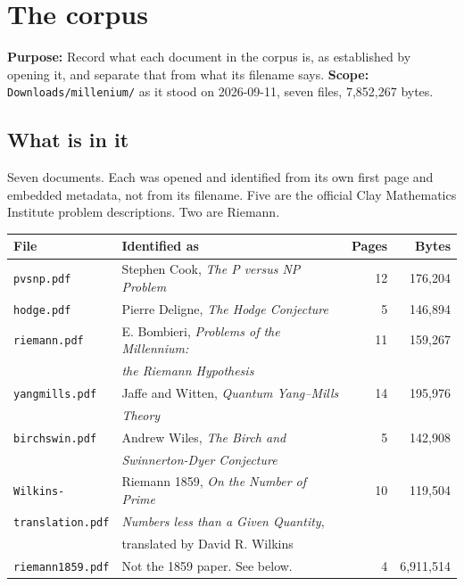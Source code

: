 \chapter{The corpus}

\textbf{Purpose:} Record what each document in the corpus is, as established by opening it, and
separate that from what its filename says. \textbf{Scope:}
\texttt{Downloads/\allowbreak{}millenium/\allowbreak{}} as it stood on 2026-09-11, seven files,
7{,}852{,}267 bytes.

\section{What is in it}

Seven documents. Each was opened and identified from its own first page and embedded metadata, not
from its filename. Five are the official Clay Mathematics Institute problem descriptions. Two are
Riemann.

\begin{center}
\begin{tabular}{@{}llrr@{}}
\toprule
File & Identified as & Pages & Bytes \\
\midrule
\texttt{pvsnp.pdf}       & Stephen Cook, \emph{The P versus NP Problem}      & 12 & 176{,}204 \\
\texttt{hodge.pdf}       & Pierre Deligne, \emph{The Hodge Conjecture}       & 5  & 146{,}894 \\
\texttt{riemann.pdf}     & E. Bombieri, \emph{Problems of the Millennium:}   & 11 & 159{,}267 \\
                         & \emph{the Riemann Hypothesis}                     &    &           \\
\texttt{yangmills.pdf}   & Jaffe and Witten, \emph{Quantum Yang--Mills}      & 14 & 195{,}976 \\
                         & \emph{Theory}                                     &    &           \\
\texttt{birchswin.pdf}   & Andrew Wiles, \emph{The Birch and}                & 5  & 142{,}908 \\
                         & \emph{Swinnerton-Dyer Conjecture}                 &    &           \\
\texttt{Wilkins-}        & Riemann 1859, \emph{On the Number of Prime}       & 10 & 119{,}504 \\
\texttt{translation.pdf} & \emph{Numbers less than a Given Quantity},         &    &           \\
                         & translated by David R. Wilkins                    &    &           \\
\texttt{riemann1859.pdf} & Not the 1859 paper. See below.                    & 4  & 6{,}911{,}514 \\
\bottomrule
\end{tabular}
\end{center}


